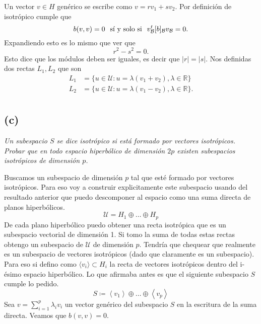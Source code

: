 Un vector  $v \in H$ genérico se escribe como $v=rv_1 + sv_2$. Por definición de isotrópico cumple que 
\[ b(v,v) = 0 \hspace{0.25cm} \text{sí y solo si} \hspace{0.25cm} v^{t}_{\mathcal{B}}[b]_{\mathcal{B}}v_{\mathcal{B}}=0. \]
Expandiendo esto es lo mismo que ver que
\[ r^2 - s^2 = 0. \]
Esto dice que los módulos deben ser iguales, es decir que $|r|=|s|$. Nos definidas dos rectas $L_1, L_2$ que son
\begin{align*}
L_1 &= \{u \in \mathcal U : u =\lambda(v_1 + v_2) , \lambda \in \mathbb{R}\} \\
L_2 &= \{u \in \mathcal U : u =\lambda(v_1 - v_2) , \lambda \in \mathbb{R}\}. \\
\end{align*}




\subsection*{(c)}
\textit{Un subespacio $S$ se dice isotr\'opico si est\'a formado por vectores isotr\'opicos. Probar
	que en todo espacio hiperb\'olico de dimensi\'on $2p$ existen subespacios isotr\'opicos de
	dimensi\'on $p$.}

\bigskip 

Buscamos un subespacio de dimensión $p$ tal que esté formado por vectores isotrópicos. Para eso voy a construir explicitamente este subespacio usando del resultado anterior  que puedo descomponer al espacio como una suma directa de planos hiperbólicos. 
\begin{equation*}
\mathcal{U} = H_1 \oplus \dots \oplus H_{p} 
\end{equation*}
De cada plano hiperbólico puedo obtener una recta isotrópica que es un subespacio vectorial de dimensión 1. Si tomo la suma de todas estas rectas obtengo un subespacio de $\mathcal{U}$ de dimensión $p$. Tendría que chequear que realmente es un subespacio de vectores isotrópicos (dado que claramente es un subespacio). Para eso si defino como $\langle v_i \rangle \subset H_i$ la recta de vectores isotrópicos dentro del i-ésimo espacio hiperbólico. Lo que afirmaba antes es que el siguiente subespacio $S$ cumple lo pedido.
\[S \coloneqq \left\langle v_1 \right\rangle \oplus \dots \oplus \left\langle v_p \right\rangle   \]
Sea $v= \sum_{i=1}^{p} \lambda_{i}v_{i}$ un vector genérico del subespacio $S$ en la escritura de la suma directa. Veamos que $b(v,v)=0$.

